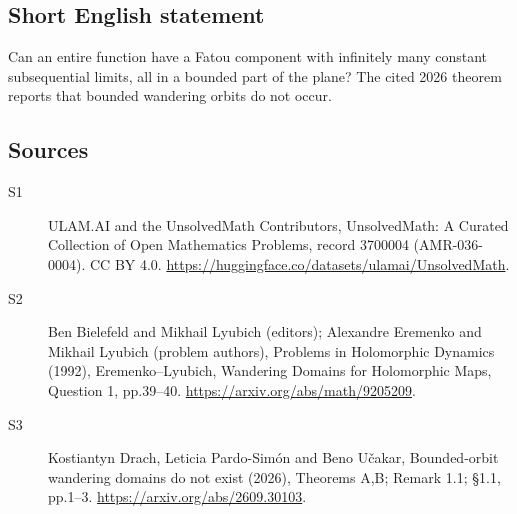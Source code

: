 \documentclass[11pt]{article}
\begin{document}
\subsection{Short English statement}
Can an entire function have a Fatou component with infinitely many constant subsequential limits, all in a bounded part of the plane? The cited 2026 theorem reports that bounded wandering orbits do not occur.
\subsection{Sources}
\begin{description}
\item[\hypertarget{source:3700004:1}{S1}] ULAM.AI and the UnsolvedMath Contributors, UnsolvedMath: A Curated Collection of Open Mathematics Problems, record 3700004 (AMR-036-0004). CC BY 4.0. \url{https://huggingface.co/datasets/ulamai/UnsolvedMath}.
\item[\hypertarget{source:3700004:2}{S2}] Ben Bielefeld and Mikhail Lyubich (editors); Alexandre Eremenko and Mikhail Lyubich (problem authors), Problems in Holomorphic Dynamics (1992), Eremenko–Lyubich, Wandering Domains for Holomorphic Maps, Question 1, pp.39–40. \url{https://arxiv.org/abs/math/9205209}.
\item[\hypertarget{source:3700004:3}{S3}] Kostiantyn Drach, Leticia Pardo-Simón and Beno Učakar, Bounded-orbit wandering domains do not exist (2026), Theorems A,B; Remark 1.1; §1.1, pp.1–3. \url{https://arxiv.org/abs/2609.30103}.
\end{description}
\label{end:3700004}
\end{document}
